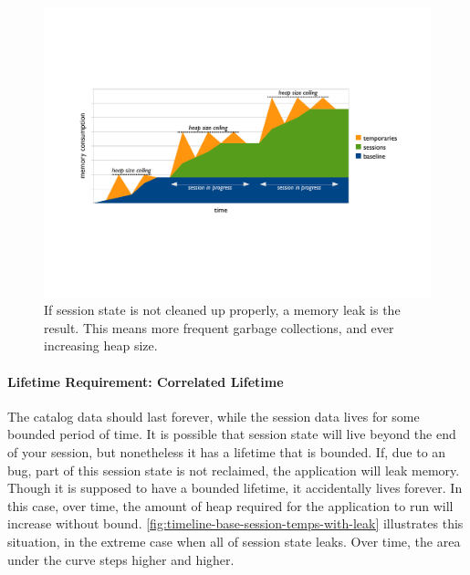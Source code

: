 \begin{figure}
	\centering
	\includegraphics[width=\textwidth]{part4/Figures/lifetime/timeline-base-session-temps-with-leak}
	\caption{If session state is not cleaned up
	properly, a memory leak is the result. This means more frequent garbage
	collections, and ever increasing heap size.}
	\label{fig:timeline-base-session-temps-with-leak}
\end{figure}

\paragraph{Lifetime Requirement: Correlated Lifetime}
The catalog data should last forever, while the
session data lives for some bounded period of time. It is possible that session
state will live beyond the end of your session, but nonetheless it has a
lifetime that is bounded. If, due to an bug, part of this session state is not
reclaimed, the application will leak memory. Though it is supposed to have a bounded lifetime, it
accidentally lives forever. In this
case, over time, the amount of heap required for the application to run will increase without bound.
\autoref{fig:timeline-base-session-temps-with-leak} illustrates this situation,
in the extreme case when all of session state leaks. Over time, the area under
the curve steps higher and higher.


